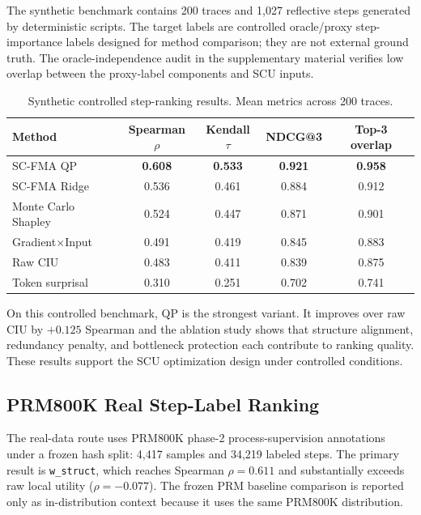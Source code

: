 \documentclass[a4paper,fleqn]{cas-sc}
\begin{document}
The synthetic benchmark contains 200 traces and 1,027 reflective steps generated by deterministic scripts. The target labels are controlled oracle/proxy step-importance labels designed for method comparison; they are not external ground truth. The oracle-independence audit in the supplementary material verifies low overlap between the proxy-label components and SCU inputs.

\begin{table}[t]
\caption{Synthetic controlled step-ranking results. Mean metrics across 200 traces.}
\label{tab:synthetic-main}
\centering
\small
\begin{tabular}{lcccc}
\toprule
\textbf{Method} & \textbf{Spearman $\rho$} & \textbf{Kendall $\tau$} & \textbf{NDCG@3} & \textbf{Top-3 overlap} \\
\midrule
SC-FMA QP & \textbf{0.608} & \textbf{0.533} & \textbf{0.921} & \textbf{0.958} \\
SC-FMA Ridge & 0.536 & 0.461 & 0.884 & 0.912 \\
Monte Carlo Shapley & 0.524 & 0.447 & 0.871 & 0.901 \\
Gradient$\times$Input & 0.491 & 0.419 & 0.845 & 0.883 \\
Raw CIU & 0.483 & 0.411 & 0.839 & 0.875 \\
Token surprisal & 0.310 & 0.251 & 0.702 & 0.741 \\
\bottomrule
\end{tabular}
\end{table}

On this controlled benchmark, QP is the strongest variant. It improves over raw CIU by $+0.125$ Spearman and the ablation study shows that structure alignment, redundancy penalty, and bottleneck protection each contribute to ranking quality. These results support the SCU optimization design under controlled conditions.

\subsection{PRM800K Real Step-Label Ranking}
\label{sec:real-prm800k}

The real-data route uses PRM800K phase-2 process-supervision annotations under a frozen hash split: 4,417 samples and 34,219 labeled steps. The primary result is \texttt{w\_struct}, which reaches Spearman $\rho=0.611$ and substantially exceeds raw local utility ($\rho=-0.077$). The frozen PRM baseline comparison is reported only as in-distribution context because it uses the same PRM800K distribution.
\end{document}
